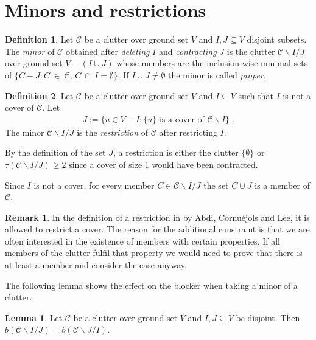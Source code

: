 \documentclass[a4paper, 12pt, twoside=false]{scrbook}
\theoremstyle{definition}
\newtheorem*{definition}{Definition}
\newtheorem*{remark}{Remark}
\newtheorem{lemma}[theorem]{Lemma}
\begin{document}
\section{Minors and restrictions}
\begin{definition}
    Let $\mathcal{C}$ be a clutter over ground set $V$ and $I, J \subseteq V$ disjoint subsets.
    The \emph{minor} of $\mathcal{C}$ obtained after \emph{deleting} $I$ and \emph{contracting} $J$ is the clutter $\mathcal{C} \backslash I / J$ over ground set $V - (I \cup J)$ whose members are the inclusion-wise minimal sets of $\{C-J : C~\in~\mathcal{C},\, C~\cap~I = \emptyset\}$.
    If $I \cup J \neq \emptyset$ the minor is called \emph{proper}.
\end{definition}

\begin{definition}
    Let $\mathcal{C}$ be a clutter over ground set $V$ and $I \subseteq V$ such that $I$ is not a cover of $\mathcal{C}$.
    Let
    \begin{align*}
        J := \{u \in V-I : \{u\} \text{ is a cover of } \mathcal{C} \backslash I\} \;.
    \end{align*}
    The minor $\mathcal{C} \backslash I / J$ is the \emph{restriction} of $\mathcal{C}$ after restricting $I$.
\end{definition}

By the definition of the set $J$, a restriction is either the clutter $\{\emptyset\}$ or $\tau(\mathcal{C}\backslash I /J) \geq 2$ since a cover of size 1 would have been contracted.

Since $I$ is not a cover, for every member $C \in \mathcal{C} \backslash I /J$ the set $C \cup J$ is a member of $\mathcal{C}$.

\begin{remark}
    In the definition of a restriction in \cite{restrictions} by Abdi, Cornuéjols and Lee, it is allowed to restrict a cover.
    The reason for the additional constraint is that we are often interested in the existence of members with certain properties.
    If all members of the clutter fulfil that property we would need to prove that there is at least a member and consider the case anyway.
\end{remark}

The following lemma shows the effect on the blocker when taking a minor of a clutter.
\begin{lemma}
    Let $\mathcal{C}$ be a clutter over ground set $V$ and $I,J \subseteq V$ be disjoint.
    Then $b(\mathcal{C}\backslash I /J) = b(\mathcal{C} \backslash J / I)$.
\end{lemma}
\end{document}
